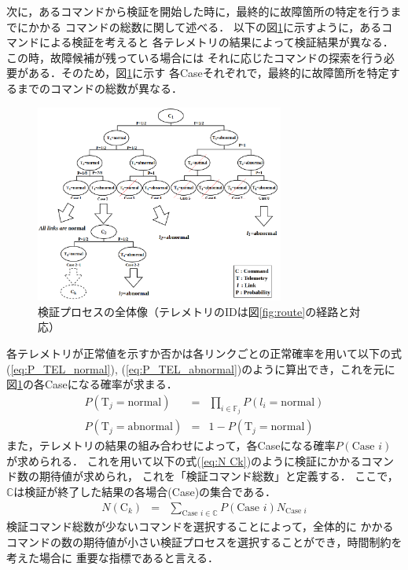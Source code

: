 \documentclass[11pt]{jsarticle}%
\begin{document}
\begin{multicols}{2}
次に，あるコマンドから検証を開始した時に，最終的に故障箇所の特定を行うまでにかかる
コマンドの総数に関して述べる．
以下の図\ref{fig:all_process}に示すように，あるコマンドによる検証を考えると
各テレメトリの結果によって検証結果が異なる．この時，故障候補が残っている場合には
それに応じたコマンドの探索を行う必要がある．そのため，図\ref{fig:all_process}に示す
各Caseそれぞれで，最終的に故障箇所を特定するまでのコマンドの総数が異なる．
\begin{figure}[H]
  \centering
    \includegraphics[height=6.5cm]{../figure/all_process.png}
    \caption{検証プロセスの全体像（テレメトリのIDは図\ref{fig:route}の経路と対応）}
    \label{fig:all_process}
\end{figure}
\vspace{-1zh}
各テレメトリが正常値を示すか否かは各リンクごとの正常確率を用いて以下の式(\ref{eq:P_TEL_normal}),
(\ref{eq:P_TEL_abnormal})のように算出でき，これを元に図\ref{fig:all_process}の各Caseになる確率が求まる．
\begin{eqnarray}
  P(\text{T}_j = \text{normal}) &=& \prod_{i\in\mathbb{F}_j} P(l_i = \text{normal}) \label{eq:P_TEL_normal}\\
  P(\text{T}_j = \text{abnormal}) &=& 1 - P(\text{T}_j = \text{normal}) \label{eq:P_TEL_abnormal}
\end{eqnarray}
また，テレメトリの結果の組み合わせによって，各Caseになる確率$P(\text{Case }i)$が求められる．
これを用いて以下の式(\ref{eq:N Ck})のように検証にかかるコマンド数の期待値が求められ，
これを「検証コマンド総数」と定義する．
ここで，$\mathbb{C}$は検証が終了した結果の各場合(Case)の集合である．%
\begin{eqnarray}
  N(\text{C}_k) &=& \sum_{\text{Case }i\in\mathbb{C}} P(\text{Case }i) N_{\text{Case }i} \label{eq:N Ck}
\end{eqnarray}
検証コマンド総数が少ないコマンドを選択することによって，全体的に
かかるコマンドの数の期待値が小さい検証プロセスを選択することができ，時間制約を考えた場合に
重要な指標であると言える．


\end{multicols}
\end{document}
